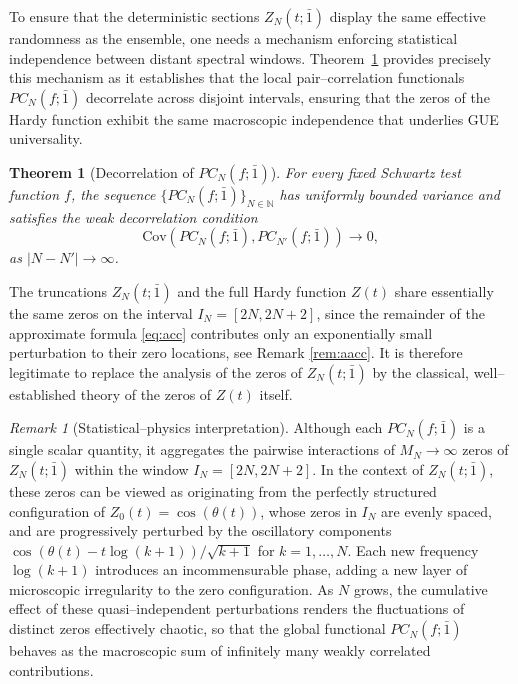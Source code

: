 \documentclass[12pt,reqno]{amsart}
\theoremstyle{plain}
\newtheorem{theorem}{Theorem}[section]
\theoremstyle{definition}
\theoremstyle{remark}
\newtheorem{rem}{Remark}[section]       %
\begin{document}
To ensure that the deterministic sections $Z_N(t;\bar 1)$ display the same effective randomness as the ensemble, one needs a mechanism enforcing statistical independence between distant spectral windows.
Theorem~\ref{thm:Sel-dec} provides precisely this mechanism as it establishes that the local pair--correlation functionals $PC_N(f;\bar1)$ decorrelate across disjoint intervals, ensuring that the zeros of the Hardy function exhibit the same macroscopic independence that underlies GUE universality.


\begin{theorem}[Decorrelation of $PC_N(f; \bar 1)$]
\label{thm:Sel-dec}
For every fixed Schwartz test function $f$, the sequence $\{PC_N(f;\bar 1)\}_{N \in \mathbb{N}}$ has uniformly bounded variance and
satisfies the weak decorrelation condition
\begin{equation}
\label{eq:Sel-dec}
\mathrm{Cov}\!\left(PC_N(f;\bar 1),PC_{N'}(f;\bar 1)\right)\to 0,
\end{equation}
as $|N-N'|\to\infty$.
\end{theorem}


The truncations $Z_N(t; \bar 1)$ and the full Hardy function $Z(t)$ share 
essentially the same zeros on the interval $I_N=[2N,2N+2]$, 
since the remainder of the approximate formula \eqref{eq:acc} contributes only an exponentially small perturbation to their zero locations, see Remark \ref{rem:aacc}.  
It is therefore legitimate to replace the analysis of the zeros of $Z_N(t;\bar 1)$ by the classical, 
well–established theory of the zeros of $Z(t)$ itself.

\begin{rem}[Statistical–physics interpretation]
Although each $PC_N(f;\bar 1)$ is a single scalar quantity, it aggregates the 
pairwise interactions of $M_N\!\to\!\infty$ zeros of $Z_N(t;\bar 1)$ within the 
window $I_N=[2N,2N+2]$. In the context of $Z_N(t; \bar 1)$, these zeros can be viewed as originating from the perfectly structured 
configuration of $Z_0(t)=\cos(\theta(t))$, whose zeros in $I_N$ are evenly spaced, 
and are progressively perturbed by the oscillatory components 
$\cos(\theta(t)-t\log(k+1))/\sqrt{k+1}$ for $k=1,\dots,N$.  
Each new frequency $\log(k+1)$ introduces an incommensurable phase, adding 
a new layer of microscopic irregularity to the zero configuration.  
As $N$ grows, the cumulative effect of these quasi–independent perturbations 
renders the fluctuations of distinct zeros effectively chaotic, 
so that the global functional $PC_N(f;\bar 1)$ behaves as the macroscopic sum of 
infinitely many weakly correlated contributions. 
\end{rem}
\end{document}

